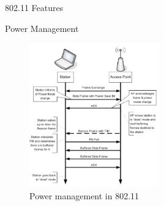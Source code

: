 \begin{section}{802.11 Features}
\begin{subsection}{Power Management}
    \begin{figure}[h]
      \centering
      \includegraphics[width=0.5\textwidth]{img/wireless/80211 power saving.png}
      \caption{Power management in 802.11}
    \end{figure}

  \end{subsection}

\end{section}
